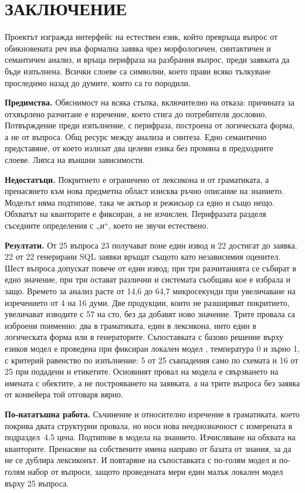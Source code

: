 \section*{ЗАКЛЮЧЕНИЕ}
\label{sec:conclusion}

Проектът изгражда интерфейс на естествен език, който превръща въпрос от обикновената реч
във формална заявка чрез морфологичен, синтактичен и семантичен анализ, и връща перифраза
на разбрания въпрос, преди заявката да бъде изпълнена. Всички слоеве са символни, което
прави всяко тълкуване проследимо назад до думите, които са го породили.

\textbf{Предимства.} Обяснимост на всяка стъпка, включително на отказа: причината за
отхвърлено разчитане е изречение, което стига до потребителя дословно. Потвърждение преди
изпълнение, с перифраза, построена от логическата форма, а не от въпроса. Общ ресурс между
анализа и синтеза. Едно семантично представяне, от което излизат два целеви езика без
промяна в предходните слоеве. Липса на външни зависимости.

\textbf{Недостатъци.} Покритието е ограничено от лексикона и от граматиката, а пренасянето
към нова предметна област изисква ръчно описание на знанието. Моделът няма подтипове, така
че актьор и режисьор са едно и също нещо. Обхватът на кванторите е фиксиран, а не
изчислен. Перифразата разделя съседните определения с „и“, което не звучи естествено.

\textbf{Резултати.} От 25 въпроса 23 получават поне един извод и 22 достигат до заявка. 22
от 22 генерирани SQL заявки връщат същото като независимия оценител. Шест въпроса допускат
повече от един извод; при три разчитанията се събират в едно значение, при три остават
различни и системата съобщава кое е избрала и защо. Времето за анализ расте от 14,6 до
64,7 микросекунди при увеличаване на изречението от 4 на 16 думи. Две продукции, които не
разширяват покритието, увеличават изводите с 57 на сто, без да добавят ново значение.
Трите провала са изброени поименно: два в граматиката, един в лексикона, нито един в
логическата форма или в генераторите. Съпоставката с базово решение върху езиков модел е
проведена при фиксиран локален модел , температура 0 и зърно 1, с
критерий равенство по изпълнение: 5 от 25 съвпадения само по схемата и 16 от 25 при
подадени и етикетите. Основният провал на модела е свързването на имената с обектите, а не
построяването на заявката, а на трите въпроса без заявка от конвейера той отговаря вярно.

\textbf{По-нататъшна работа.} Съчинение и относително изречение в граматиката, което
покрива двата структурни провала, но носи нова нееднозначност с измерената в
подраздел~4.5 цена. Подтипове в модела на знанието. Изчисляване на обхвата на
кванторите. Пренасяне на собствените имена направо от базата от знания, за да не се
дублира лексиконът. И повтаряне на съпоставката с по-голям модел и по-голям набор от
въпроси, защото проведената мери един малък локален модел върху 25 въпроса.
